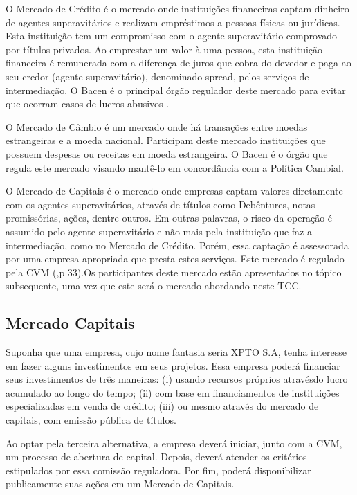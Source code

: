 O Mercado de Crédito é o mercado onde instituições financeiras captam dinheiro de agentes superavitários e realizam empréstimos a pessoas físicas ou jurídicas. Esta instituição tem um compromisso com o agente superavitário comprovado por títulos privados. Ao emprestar um valor à uma pessoa, esta instituição financeira é remunerada com a diferença de juros que cobra do devedor e paga ao seu credor (agente superavitário), denominado spread, pelos serviços de intermediação. O Bacen é o principal órgão regulador deste mercado para evitar que ocorram casos de lucros abusivos \cite[p. 32]{cmv2014}.

O Mercado de Câmbio é um mercado onde há transações entre moedas estrangeiras e a moeda nacional. Participam deste mercado instituições que possuem despesas ou receitas em moeda estrangeira. O Bacen é o órgão que regula este mercado visando mantê-lo em concordância com a Política Cambial\cite[p. 32]{cmv2014}.

O Mercado de Capitais é o mercado onde empresas captam valores diretamente com os agentes superavitários, através de títulos como Debêntures, notas promissórias, ações, dentre outros. Em outras palavras, o risco da operação é assumido pelo agente superavitário e não mais pela instituição que faz a intermediação, como no Mercado de Crédito. Porém, essa captação é assessorada por uma empresa apropriada que presta estes serviços. Este mercado é regulado pela CVM (\citeyear{cmv2014},p 33).Os participantes deste mercado estão apresentados no tópico subsequente, uma vez que este será o mercado abordando neste TCC.

\subsection{Mercado Capitais}

Suponha que uma empresa, cujo nome fantasia seria XPTO S.A, tenha interesse em fazer alguns investimentos em seus projetos. Essa empresa poderá financiar seus investimentos de três maneiras: (i) usando recursos próprios atravésdo lucro acumulado ao longo do tempo; (ii) com base em financiamentos de instituições especializadas em venda de crédito; (iii) ou mesmo através do mercado de capitais, com emissão pública de títulos.
	
Ao optar pela terceira alternativa, a empresa deverá iniciar, junto com a CVM, um processo de abertura de capital. Depois, deverá atender os critérios estipulados por essa comissão reguladora. Por fim, poderá disponibilizar publicamente suas ações  em um Mercado de Capitais. 

